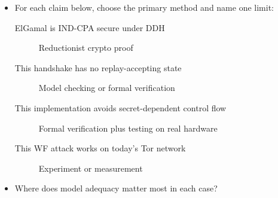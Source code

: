 
\begin{frame}
  \begin{activity}
  \begin{itemize}
    \item For each claim below, choose the primary method and name one limit:
      \begin{description}
        \item[ElGamal is IND-CPA secure under DDH] Reductionist crypto proof
        \item[This handshake has no replay-accepting state] Model checking or 
          formal verification
        \item[This implementation avoids secret-dependent control flow] Formal 
          verification plus testing on real hardware
        \item[This WF attack works on today's Tor network] Experiment or 
          measurement
      \end{description}
    \item Where does model adequacy matter most in each case?
  \end{itemize}
  \end{activity}
\end{frame}



